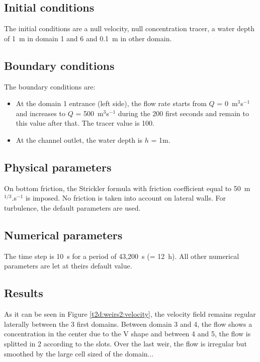 \newpage 
\subsection{Initial conditions}

The initial conditions are a null velocity, null concentration tracer,
a water depth of 1~m in domain 1 and 6 and 0.1~m in other domain.

\subsection{Boundary conditions}

The boundary conditions are:
\begin{itemize}
\item At the domain 1 entrance (left side), the flow rate starts from 
$Q$ = 0~m$^3$s$^{-1}$ and increases to $Q$ = 500~m$^3$s$^{-1}$
during the 200 first seconds and remain to this value after that.
The tracer value is 100.
\item At the channel outlet, the water depth is $h$ = 1m.
\end{itemize}

\subsection{Physical parameters}

On  bottom friction, the Strickler formula
with friction coefficient equal to
50~m$^{1/3}$.s$^{-1}$ is imposed.
No friction is taken into account on lateral walls.
For turbulence, the default parameters are used.

\subsection{Numerical parameters}

The time step is 10~s for a period of 43,200~s (= 12~h).
All other numerical parameters are let at theirs default value.

\subsection{Results}

As it can be seen in Figure \ref{t2d:weirs2:velocity},
the velocity field remains regular laterally between the 3 first domains.
Between domain 3 and 4, the flow shows a concentration in the center due to the
V shape and between 4 and 5, the flow is splitted in 2 according to the slots.
Over the last weir, the flow is irregular but smoothed by the large cell sized
of the domain...


